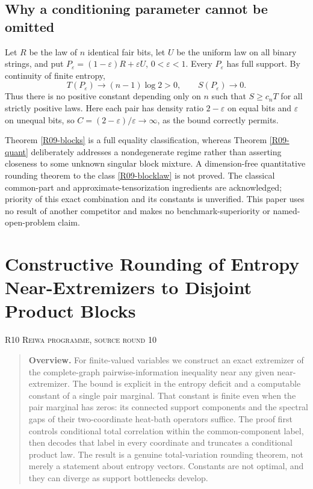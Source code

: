 \documentclass[11pt,a4paper]{article}
\theoremstyle{definition}\newtheorem{definition}[theorem]{Definition}
\theoremstyle{remark}\newtheorem{remark}[theorem]{Remark}
\numberwithin{equation}{section}
\begin{document}
\subsection{Why a conditioning parameter cannot be omitted}\label{R09-sec-5}
Let $R$ be the law of $n$ identical fair bits, let $U$ be the uniform law on all binary strings, and put $P_\varepsilon=(1-\varepsilon)R+\varepsilon U$, $0<\varepsilon<1$. Every $P_\varepsilon$ has full support. By continuity of finite entropy,
\[
 T(P_\varepsilon)\longrightarrow(n-1)\log2>0,
 \qquad S(P_\varepsilon)\longrightarrow0.
\]
Thus there is no positive constant depending only on $n$ such that $S\ge c_nT$ for all strictly positive laws. Here each pair has density ratio $2-\varepsilon$ on equal bits and $\varepsilon$ on unequal bits, so $C=(2-\varepsilon)/\varepsilon\to\infty$, as the bound correctly permits.

Theorem \ref{R09-blocks} is a full equality classification, whereas Theorem \ref{R09-quant} deliberately addresses a nondegenerate regime rather than asserting closeness to some unknown singular block mixture. A dimension-free quantitative rounding theorem to the class \eqref{R09-blocklaw} is not proved. The classical common-part and approximate-tensorization ingredients are acknowledged; priority of this exact combination and its constants is unverified. This paper uses no result of another competitor and makes no benchmark-superiority or named-open-problem claim.





\clearpage
\section[R10 --- Constructive Rounding of Entropy Near-Extremizers to Disjoint Product Blocks]{Constructive Rounding of Entropy Near-Extremizers to Disjoint Product Blocks}\label{contrib-R10}
\noindent\textsc{R10 \quad Reiwa programme, source round 10}\par\medskip


\begin{quote}\small\textbf{Overview.} For finite-valued variables we construct an exact extremizer of the complete-graph pairwise-information inequality near any given near-extremizer. The bound is explicit in the entropy deficit and a computable constant of a single pair marginal. That constant is finite even when the pair marginal has zeros: its connected support components and the spectral gaps of their two-coordinate heat-bath operators suffice. The proof first controls conditional total correlation within the common-component label, then decodes that label in every coordinate and truncates a conditional product law. The result is a genuine total-variation rounding theorem, not merely a statement about entropy vectors. Constants are not optimal, and they can diverge as support bottlenecks develop.\end{quote}
\end{document}
